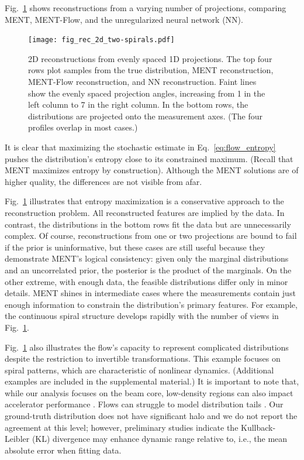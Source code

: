 \documentclass[%
    reprint,
    twocolumn,
    nofootinbib,
    amsmath,
    amssymb,
    aps,
    prstab,
]{revtex4-2}
\begin{document}
Fig.~\ref{fig:rec_2d_two_spirals} shows reconstructions from a varying number of projections, comparing MENT, MENT-Flow, and the unregularized neural network (NN).
%
\begin{figure}
    \centering
    \texttt{[image: fig\_rec\_2d\_two-spirals.pdf]}
    \caption{2D reconstructions from evenly spaced 1D projections. The top four rows plot samples from the true distribution, MENT reconstruction, MENT-Flow reconstruction, and NN reconstruction. Faint lines show the evenly spaced projection angles, increasing from 1 in the left column to 7 in the right column. In the bottom rows, the distributions are projected onto the measurement axes. (The four profiles overlap in most cases.)}
    \label{fig:rec_2d_two_spirals}
\end{figure}
%
It is clear that maximizing the stochastic estimate in Eq.~\eqref{eq:flow_entropy} pushes the distribution's entropy close to its constrained maximum. (Recall that MENT maximizes entropy by construction). Although the MENT solutions are of higher quality, the differences are not visible from afar.

Fig.~\ref{fig:rec_2d_two_spirals} illustrates that entropy maximization is a conservative approach to the reconstruction problem. All reconstructed features are implied by the data. In contrast, the distributions in the bottom rows fit the data but are unnecessarily complex. Of course, reconstructions from one or two projections are bound to fail if the prior is uninformative, but these cases are still useful because they demonstrate MENT's logical consistency: given only the marginal distributions and an uncorrelated prior, the posterior is the product of the marginals. On the other extreme, with enough data, the feasible distributions differ only in minor details. MENT shines in intermediate cases where the measurements contain just enough information to constrain the distribution's primary features. For example, the continuous spiral structure develops rapidly with the number of views in Fig.~\ref{fig:rec_2d_two_spirals}.

Fig.~\ref{fig:rec_2d_two_spirals} also illustrates the flow's capacity to represent complicated distributions despite the restriction to invertible transformations. This example focuses on spiral patterns, which are characteristic of nonlinear dynamics. (Additional examples are included in the supplemental material.) It is important to note that, while our analysis focuses on the beam core, low-density regions can also impact accelerator performance \cite{Aleksandrov_2021}. Flows can struggle to model distribution tails \cite{Laszkiewicz_2022_icml}. Our ground-truth distribution does not have significant halo and we do not report the agreement at this level; however, preliminary studies indicate the Kullback-Leibler (KL) divergence may enhance dynamic range relative to, i.e., the mean absolute error when fitting data.
\end{document}
